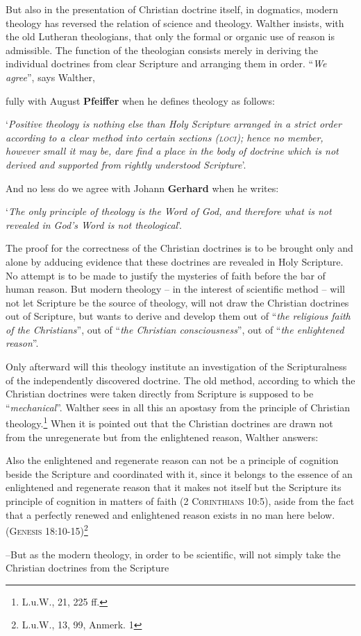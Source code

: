                 But also in the presentation of Christian doctrine itself, in dogmatics, modern theology has reversed the relation of science and theology.  Walther insists, with the old Lutheran theologians, that only the formal or organic use of reason is admissible.  The function of the theologian consists merely in deriving the individual doctrines from clear Scripture and arranging them in order.  “\textit{We agree}”, says Walther,  \begin{fancyquotes} fully with August \textbf{Pfeiffer} when he defines theology as follows: \begin{displayquote}‘\textit{Positive theology is nothing else than Holy Scripture arranged in a strict order according to a clear method into certain sections {\scriptsize\textsc{(loci)}}; hence no member, however small it may be, dare find a place in the body of doctrine which is not derived and supported from rightly understood Scripture}’.\end{displayquote}  And no less do we agree with Johann \textbf{Gerhard} when he writes:\begin{displayquote}‘\textit{The only principle of theology is the Word of God, and therefore what is not revealed in God’s Word is not theological}’.\end{displayquote}\end{fancyquotes} The proof for the correctness of the Christian doctrines is to be brought only and alone by adducing evidence that these doctrines are revealed in Holy Scripture.  No attempt is to be made to justify the mysteries of faith before the bar of human reason.  But modern theology -- in the interest of scientific method -- will not let Scripture be the source of theology, will not draw the Christian doctrines out of Scripture, but wants to derive and develop them out of “\textit{the religious faith of the Christians}”, out of “\textit{the Christian consciousness}”, out of “\textit{the enlightened reason}”. \par Only afterward will this theology institute an investigation of the Scripturalness of the independently discovered doctrine.  The old method, according to which the Christian doctrines were taken directly from Scripture is supposed to be “\textit{mechanical}”.  Walther sees in all this an apostasy from the principle of Christian theology.\footnote{L.u.W., 21, 225 ff.}  When it is pointed out that the Christian doctrines are drawn not from the unregenerate but from the enlightened reason, Walther answers:\begin{fancyquotes}Also the enlightened and regenerate reason can not be a principle of cognition beside the Scripture and coordinated with it, since it belongs to the essence of an enlightened and regenerate reason that it makes not itself but the Scripture its principle of cognition in matters of faith {\scriptsize\textsc{(2 Corinthians 10:5)}}, aside from the fact that a perfectly renewed and enlightened reason exists in no man here below. {\scriptsize \textsc{(Genesis 18:10-15)}}\footnote{L.u.W., 13, 99, Anmerk. 1}\end{fancyquotes}--But as the modern theology, in order to be scientific, will not simply take the Christian doctrines from the Scripture 